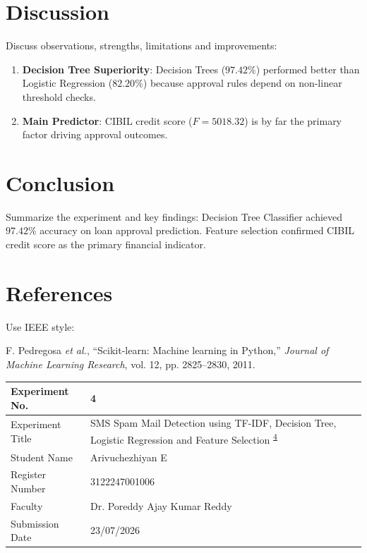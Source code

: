 \documentclass[12pt,a4paper]{article}
\begin{document}
\section{Discussion}
Discuss observations, strengths, limitations and improvements:
\begin{enumerate}
\item \textbf{Decision Tree Superiority}: Decision Trees ($97.42\%$) performed better than Logistic Regression ($82.20\%$) because approval rules depend on non-linear threshold checks.
\item \textbf{Main Predictor}: CIBIL credit score ($F=5018.32$) is by far the primary factor driving approval outcomes.
\end{enumerate}

\section{Conclusion}
Summarize the experiment and key findings:
Decision Tree Classifier achieved $97.42\%$ accuracy on loan approval prediction. Feature selection confirmed CIBIL credit score as the primary financial indicator.

\section{References}
Use IEEE style:
\begin{enumerate}[label={[\arabic*]}]
\item F. Pedregosa \textit{et al.}, ``Scikit-learn: Machine learning in Python,'' \textit{Journal of Machine Learning Research}, vol. 12, pp. 2825--2830, 2011.
\end{enumerate}

\newpage


\begin{tabular}{|p{4cm}|p{11cm}|}
\hline
Experiment No. & 4 \\ \hline
Experiment Title & SMS Spam Mail Detection using TF-IDF, Decision Tree, Logistic Regression and Feature Selection \textsuperscript{\href{https://github.com/arivuchezhiyan/Machine_Learning}{4}} \\ \hline
Student Name & Arivuchezhiyan E \\ \hline
Register Number & 3122247001006 \\ \hline
Faculty & Dr. Poreddy Ajay Kumar Reddy \\ \hline
Submission Date & 23/07/2026 \\ \hline
\end{tabular}
\end{document}
